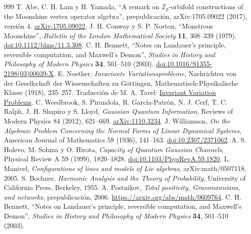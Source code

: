 \begin{thebibliography}{999}
 T. Abe, C. H. Lam y H. Yamada, ``A remark on \(\mathbb Z_p\)-orbifold constructions of the Moonshine vertex operator algebra'', prepublicación, arXiv:1705.09022 (2017), versión 4. \href{https://arxiv.org/abs/1705.09022v4}{arXiv:1705.09022}.
 J. H. Conway y S. P. Norton, ``Monstrous Moonshine'', \emph{Bulletin of the London Mathematical Society} \textbf{11}, 308--339 (1979). \href{https://doi.org/10.1112/blms/11.3.308}{doi:10.1112/blms/11.3.308}.
 C. H. Bennett, ``Notes on Landauer's principle, reversible computation, and Maxwell's Demon'', \emph{Studies in History and Philosophy of Modern Physics} \textbf{34}, 501--510 (2003). \href{https://doi.org/10.1016/S1355-2198(03)00039-X}{doi:10.1016/S1355-2198(03)00039-X}.
E. Noether, \emph{Invariante Variationsprobleme}, Nachrichten von der Gesellschaft der Wissenschaften zu Göttingen, Mathematisch-Physikalische Klasse (1918), 235--257. Traducción de M. A. Tavel: \href{https://arxiv.org/abs/physics/0503066}{Invariant Variation Problems}.
C. Weedbrook, S. Pirandola, R. García-Patrón, N. J. Cerf, T. C. Ralph, J. H. Shapiro y S. Lloyd, \emph{Gaussian Quantum Information}, Reviews of Modern Physics 84 (2012), 621--669. \href{https://arxiv.org/abs/1110.3234}{arXiv:1110.3234}.
J. Williamson, \emph{On the Algebraic Problem Concerning the Normal Forms of Linear Dynamical Systems}, American Journal of Mathematics 58 (1936), 141--163. \href{https://doi.org/10.2307/2371062}{doi:10.2307/2371062}.
A. S. Holevo, M. Sohma y O. Hirota, \emph{Capacity of Quantum Gaussian Channels}, Physical Review A 59 (1999), 1820--1828. \href{https://doi.org/10.1103/PhysRevA.59.1820}{doi:10.1103/PhysRevA.59.1820}.
 L. Manivel, \emph{Configurations of lines and models of Lie algebras}, arXiv:math/0507118, 2005.
 S. Bochner, \emph{Harmonic Analysis and the Theory of Probability}, University of California Press, Berkeley, 1955.
A. Postnikov, \emph{Total positivity, Grassmannians, and networks},
prepublicación, 2006. \url{https://arxiv.org/abs/math/0609764}.
 C. H. Bennett, ``Notes on Landauer's principle,
reversible computation, and Maxwell's Demon'', \emph{Studies in History
and Philosophy of Modern Physics} \textbf{34}, 501--510 (2003).

\end{thebibliography}
